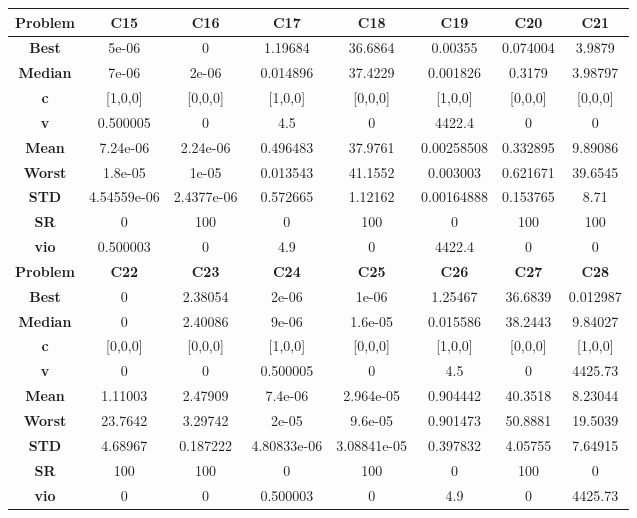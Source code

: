 \documentclass{IEEEtran}
\begin{document}
\begin{center}
\begin{tabular}{|c|c|c|c|c|c|c|c|}
    \hline 
    \hline 
    \textbf{Problem} & \textbf{C15} & \textbf{C16} & \textbf{C17} & \textbf{C18} & \textbf{C19} & \textbf{C20} & \textbf{C21} \\ 
    \hline\hline 
    \textbf{Best} & 5e-06 & 0 & 1.19684 & 36.6864 & 0.00355 & 0.074004 & 3.9879\\ 
    \textbf{Median} & 7e-06 & 2e-06 & 0.014896 & 37.4229 & 0.001826 & 0.3179 & 3.98797\\ 
    \textbf{c} & [1,0,0] & [0,0,0] & [1,0,0] & [0,0,0] & [1,0,0] & [0,0,0] & [0,0,0]\\ 
    \textbf{v} & 0.500005 & 0 & 4.5 & 0 & 4422.4 & 0 & 0\\ 
    \textbf{Mean} & 7.24e-06 & 2.24e-06 & 0.496483 & 37.9761 & 0.00258508 & 0.332895 & 9.89086\\ 
    \textbf{Worst} & 1.8e-05 & 1e-05 & 0.013543 & 41.1552 & 0.003003 & 0.621671 & 39.6545\\ 
    \textbf{STD} & 4.54559e-06 & 2.4377e-06 & 0.572665 & 1.12162 & 0.00164888 & 0.153765 & 8.71\\ 
    \textbf{SR} & 0 & 100 & 0 & 100 & 0 & 100 & 100\\ 
    \textbf{vio} & 0.500003 & 0 & 4.9 & 0 & 4422.4 & 0 & 0\\ 
    \hline 
    \hline 
    \textbf{Problem} & \textbf{C22} & \textbf{C23} & \textbf{C24} & \textbf{C25} & \textbf{C26} & \textbf{C27} & \textbf{C28} \\ 
    \hline\hline 
    \textbf{Best} & 0 & 2.38054 & 2e-06 & 1e-06 & 1.25467 & 36.6839 & 0.012987\\ 
    \textbf{Median} & 0 & 2.40086 & 9e-06 & 1.6e-05 & 0.015586 & 38.2443 & 9.84027\\ 
    \textbf{c} & [0,0,0] & [0,0,0] & [1,0,0] & [0,0,0] & [1,0,0] & [0,0,0] & [1,0,0]\\ 
    \textbf{v} & 0 & 0 & 0.500005 & 0 & 4.5 & 0 & 4425.73\\ 
    \textbf{Mean} & 1.11003 & 2.47909 & 7.4e-06 & 2.964e-05 & 0.904442 & 40.3518 & 8.23044\\ 
    \textbf{Worst} & 23.7642 & 3.29742 & 2e-05 & 9.6e-05 & 0.901473 & 50.8881 & 19.5039\\ 
    \textbf{STD} & 4.68967 & 0.187222 & 4.80833e-06 & 3.08841e-05 & 0.397832 & 4.05755 & 7.64915\\ 
    \textbf{SR} & 100 & 100 & 0 & 100 & 0 & 100 & 0\\ 
    \textbf{vio} & 0 & 0 & 0.500003 & 0 & 4.9 & 0 & 4425.73\\ 
    \hline 
  \end{tabular}
\end{center}
\newpage
\end{document}
